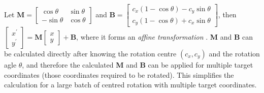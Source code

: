 \par\noindent
Let $ \textbf{M} = \begin{bmatrix} \cos\theta & \sin\theta \\ -\sin\theta & \cos\theta \end{bmatrix} $
and $ \textbf{B} = \begin{bmatrix} c_{x}(1 - \cos\theta) - c_{y}\sin\theta \\ c_{y}(1 - \cos\theta) + c_{x}\sin\theta \end{bmatrix}$, then $ \begin{bmatrix} x^{'} \\ y^{'} \end{bmatrix}  = \textbf{M} \begin{bmatrix} x \\ y \end{bmatrix} + \textbf{B}$,
where it forms an \textit{affine transformation} \cite{WolframAT}. \textbf{M} and \textbf{B} can be calculated directly after knowing the rotation centre $(c_{x}, c_{y})$ and the
rotation agle $\theta$, and therefore the calculated \textbf{M} and  \textbf{B} can be applied for multiple target coordinates (those coordinates required to be rotated). This simplifies the calculation for a large batch of centred rotation with multiple target coordinates.




